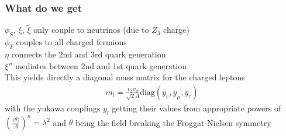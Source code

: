 \documentclass[hyperref={pdfpagelabels=false}]{beamer}
\begin{document}
\begin{frame}
 \frametitle{What do we get}
 $\phi_S$, $\xi$, $\tilde{\xi}$ only couple to neutrinos (due to $Z_3$ charge)\\
 $\phi_T$ couples to all charged fermions\\
 $\eta$ connects the 2nd and 3rd quark generation\\
 $\xi''$ mediates between 2nd and 1st quark generation\\
 \vspace{1cm}
 This yields directly a diagonal mass matrix for the charged leptons 
 \begin{align*}
m_l = \frac{v_Tv_d}{\sqrt{2}\Lambda}  \text{diag}(y_e,y_\mu,y_\tau)
 \end{align*}
 with the yukawa couplings $y_l$ getting their values from appropriate powers of $\left(\frac{\langle\theta\rangle}{\Lambda}\right)^n = \lambda^2$ and
 $\theta$ being the field breaking the Froggat-Nielsen symmetry
\end{frame}

\begin{frame}
 
\end{frame}
\end{document}
